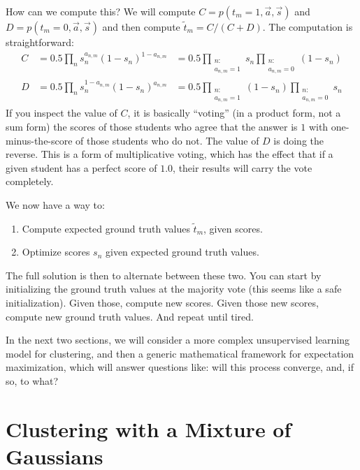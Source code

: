How can we compute this?
We will compute $C = p(t_m=1, \vec a, \vec s)$ and $D = p(t_m=0, \vec a, \vec s)$ and then compute $\tilde t_m = C / (C+D)$.
The computation is straightforward:
%
\begin{align}
  C &= 0.5 \prod_n s_n^{a_{n,m}} (1-s_n)^{1-a_{n,m}}
    &= 0.5 \prod_{\substack{n : \\ a_{n,m} = 1}} s_n \prod_{\substack{n : \\ a_{n,m} = 0}} (1-s_n) \\
  D &= 0.5 \prod_n s_n^{1-a_{n,m}} (1-s_n)^{a_{n,m}}
    &= 0.5 \prod_{\substack{n : \\ a_{n,m} = 1}} (1-s_n) \prod_{\substack{n : \\ a_{n,m} = 0}} s_n
\end{align}
%
If you inspect the value of $C$, it is basically ``voting'' (in a product form, not a sum form) the scores of those students who agree that the answer is $1$ with one-minus-the-score of those students who do not.
The value of $D$ is doing the reverse.
This is a form of multiplicative voting, which has the effect that if a given student has a perfect score of $1.0$, their results will carry the vote completely.

We now have a way to:
\begin{enumerate}
\item Compute expected ground truth values $\tilde t_m$, given scores.
\item Optimize scores $s_n$ given expected ground truth values.
\end{enumerate}
The full solution is then to alternate between these two.
You can start by initializing the ground truth values at the majority vote (this seems like a safe initialization).
Given those, compute new scores.
Given those new scores, compute new ground truth values.
And repeat until tired.

In the next two sections, we will consider a more complex unsupervised learning model for clustering,
and then a generic mathematical framework for expectation maximization, which will answer questions like: will this process converge, and, if so, to what?


\section{Clustering with a Mixture of Gaussians}

